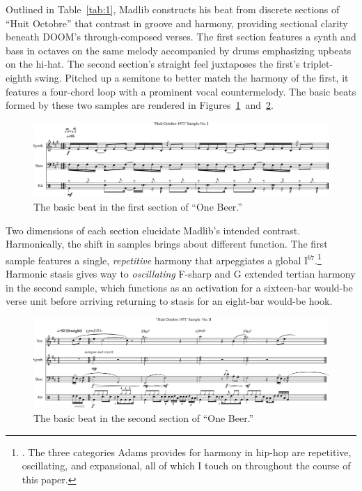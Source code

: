\normalsize Outlined in Table~\ref{tab:1}, Madlib constructs his beat from discrete sections of ``Huit Octobre'' that contrast in groove and harmony, providing sectional clarity beneath DOOM's through-composed verses. The first section features a synth and bass in octaves on the same melody accompanied by drums emphasizing upbeats on the hi-hat. The second section's straight feel juxtaposes the first's triplet-eighth swing. Pitched up a semitone to better match the harmony of the first, it features a four-chord loop with a prominent vocal countermelody. The basic beats formed by these two samples are rendered in Figures~\ref{fig:1.2}~and~\ref{fig:1.3}.

\begin{figure}[h]
    \centering
    \includegraphics[width=\textwidth]{images/figures/chp 02/Figure-02.1-One-Beer-BB-I.pdf}
    \caption{The basic beat in the first section of ``One Beer.''}
    \label{fig:1.2}
\end{figure}

Two dimensions of each section elucidate Madlib's intended contrast. Harmonically, the shift in samples brings about different function. The first sample features a single, \emph{repetitive} harmony that arpeggiates a global I$^{b7}$.\footnote{\cite{kyleadamsHarmonicSyntacticMotivic2020}. The three categories Adams provides for harmony in hip-hop are repetitive, oscillating, and expansional, all of which I touch on throughout the course of this paper.} Harmonic stasis gives way to \emph{oscillating} F-sharp and G extended tertian harmony in the second sample, which functions as an activation for a sixteen-bar would-be verse unit before arriving returning to stasis for an eight-bar would-be hook.

\begin{figure}[h]
    \centering
    \includegraphics[width=\textwidth]{images/figures/chp 02/Figure-02.2-One-Beer-BB-II.pdf}
    \caption{The basic beat in the second section of ``One Beer.''}
    \label{fig:1.3}
\end{figure}


